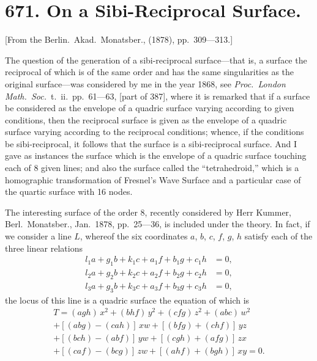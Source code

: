 \documentclass[12pt,a4paper]{article}
\theoremstyle{cayley}
\theoremstyle{definition}
\numberwithin{equation}{section}
\begin{document}
\newpage

\section*{671. On a Sibi-Reciprocal Surface.}

[From the Berlin.\ Akad.\ Monatsber., (1878), pp.\ 309---313.]

The question of the generation of a sibi-reciprocal surface---that is, a surface the reciprocal of which is of the same order and has the same singularities as the original surface---was considered by me in the year 1868, see \textit{Proc.\ London Math.\ Soc.}\ t.\ ii.\ pp.\ 61---63, [part of 387], where it is remarked that if a surface be considered as the envelope of a quadric surface varying according to given conditions, then the reciprocal surface is given as the envelope of a quadric surface varying according to the reciprocal conditions; whence, if the conditions be sibi-reciprocal, it follows that the surface is a sibi-reciprocal surface. And I gave as instances the surface which is the envelope of a quadric surface touching each of 8 given lines; and also the surface called the ``tetrahedroid,'' which is a homographic transformation of Fresnel's Wave Surface and a particular case of the quartic surface with 16 nodes.

The interesting surface of the order 8, recently considered by Herr Kummer, Berl.\ Monatsber., Jan.\ 1878, pp.\ 25---36, is included under the theory. In fact, if we consider a line $L$, whereof the six coordinates $a$, $b$, $c$, $f$, $g$, $h$ satisfy each of the three linear relations
\begin{align*}
l_1 a + g_1 b + k_1 c + a_1 f + b_1 g + c_1 h &= 0,\\
l_2 a + g_2 b + k_2 c + a_2 f + b_2 g + c_2 h &= 0,\\
l_3 a + g_3 b + k_3 c + a_3 f + b_3 g + c_3 h &= 0,
\end{align*}
the locus of this line is a quadric surface the equation of which is
\begin{multline*}
T = (agh)\, x^2 + (bhf)\, y^2 + (cfg)\, z^2 + (abc)\, w^2 \\
+ [(abg) - (cah)]\, xw + [(bfg) + (chf)]\, yz \\
+ [(bch) - (abf)]\, yw + [(cgh) + (afg)]\, zx \\
+ [(caf) - (bcg)]\, zw + [(ahf) + (bgh)]\, xy = 0.
\end{multline*}
\end{document}
